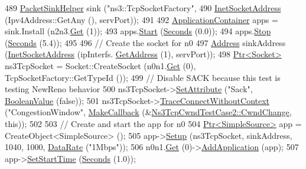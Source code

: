 \begin{DoxyCode}
489   \hyperlink{classns3_1_1PacketSinkHelper}{PacketSinkHelper} sink (\textcolor{stringliteral}{"ns3::TcpSocketFactory"},
490                          \hyperlink{classns3_1_1InetSocketAddress}{InetSocketAddress} (Ipv4Address::GetAny (), servPort));
491 
492   \hyperlink{classns3_1_1ApplicationContainer}{ApplicationContainer} apps = sink.Install (n2n3.\hyperlink{classns3_1_1NodeContainer_a9ed96e2ecc22e0f5a3d4842eb9bf90bf}{Get} (1));
493   apps.\hyperlink{classns3_1_1ApplicationContainer_a8eff87926507020bbe3e1390358a54a7}{Start} (\hyperlink{group__timecivil_ga33c34b816f8ff6628e33d5c8e9713b9e}{Seconds} (0.0));
494   apps.\hyperlink{classns3_1_1ApplicationContainer_adfc52f9aa4020c8714679b00bbb9ddb3}{Stop} (\hyperlink{group__timecivil_ga33c34b816f8ff6628e33d5c8e9713b9e}{Seconds} (5.4));
495 
496   \textcolor{comment}{// Create the socket for n0}
497   \hyperlink{classns3_1_1Address}{Address} sinkAddress (\hyperlink{classns3_1_1InetSocketAddress}{InetSocketAddress} (ipInterfs.
      \hyperlink{classns3_1_1Ipv4InterfaceContainer_ae63208dcd222be986822937ee4aa828c}{GetAddress} (1), servPort));
498   \hyperlink{classns3_1_1Ptr}{Ptr<Socket>} ns3TcpSocket = Socket::CreateSocket (n0n1.\hyperlink{classns3_1_1NodeContainer_a9ed96e2ecc22e0f5a3d4842eb9bf90bf}{Get} (0), TcpSocketFactory::GetTypeId 
      ());
499   \textcolor{comment}{// Disable SACK because this test is testing NewReno behavior}
500   ns3TcpSocket->\hyperlink{classns3_1_1ObjectBase_ac60245d3ea4123bbc9b1d391f1f6592f}{SetAttribute} (\textcolor{stringliteral}{"Sack"}, \hyperlink{classns3_1_1BooleanValue}{BooleanValue} (\textcolor{keyword}{false}));
501   ns3TcpSocket->\hyperlink{classns3_1_1ObjectBase_a1be45f6fd561e75dcac9dfa81b2b81e4}{TraceConnectWithoutContext} (\textcolor{stringliteral}{"CongestionWindow"}, 
      \hyperlink{group__makecallbackmemptr_ga9376283685aa99d204048d6a4b7610a4}{MakeCallback} (&\hyperlink{classNs3TcpCwndTestCase2_a1e9ae03c6f411d674199824234aefc1a}{Ns3TcpCwndTestCase2::CwndChange}, \textcolor{keyword}{this}));
502 
503   \textcolor{comment}{// Create and start the app for n0}
504   \hyperlink{classns3_1_1Ptr}{Ptr<SimpleSource>} app = CreateObject<SimpleSource> ();
505   app->\hyperlink{classSimpleSource_aa6ca35f5717073eccd278f9afa3d41d5}{Setup} (ns3TcpSocket, sinkAddress, 1040, 1000, \hyperlink{classns3_1_1DataRate}{DataRate} (\textcolor{stringliteral}{"1Mbps"}));
506   n0n1.\hyperlink{classns3_1_1NodeContainer_a9ed96e2ecc22e0f5a3d4842eb9bf90bf}{Get} (0)->\hyperlink{classns3_1_1Node_ab98b4fdc4aadc86366b80e8a79a53f47}{AddApplication} (app);
507   app->\hyperlink{classns3_1_1Application_a8360a49748e30c52ffdcc7a305c3cd48}{SetStartTime} (\hyperlink{group__timecivil_ga33c34b816f8ff6628e33d5c8e9713b9e}{Seconds} (1.0));

\end{DoxyCode}
